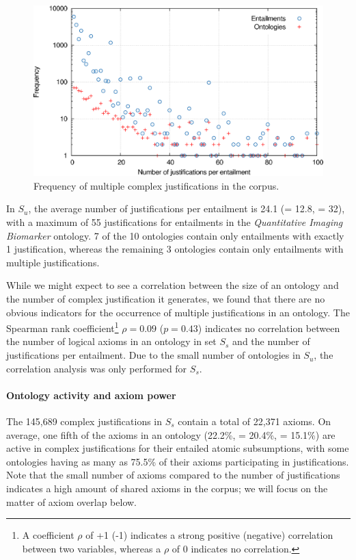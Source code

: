 \begin{figure}
\centering
\includegraphics[width=14cm]{plots/frequency.pdf}
\caption{Frequency of multiple complex justifications in the corpus.}
\label{fig:frequency-justperent-nonself-sat}
\end{figure}

In $S_{u}$, the average number of justifications per entailment is 24.1 (\sdev = 12.8, \median = 32), with a maximum of 55 justifications for entailments in the \emph{Quantitative Imaging Biomarker} ontology. 7 of the 10 ontologies contain only entailments with exactly 1 justification, whereas the remaining 3 ontologies contain only entailments with multiple justifications. 

While we might expect to see a correlation between the size of an ontology and the number of complex justification it generates, we found that there are no obvious indicators for the occurrence of multiple justifications in an ontology. The Spearman rank coefficient\footnote{A coefficient $\rho$ of +1 (-1) indicates a strong positive (negative) correlation between two variables, whereas a $\rho$ of 0 indicates no correlation.} $\rho = 0.09$ ($p = 0.43$) indicates no correlation between the number of logical axioms in an ontology in set $S_{s}$ and the number of justifications per entailment. Due to the small number of ontologies in $S_{u}$, the correlation analysis was only performed for $S_{s}$.

\paragraph{Ontology activity and axiom power}

The 145,689 complex justifications in $S_{s}$ contain a total of 22,371 axioms. On average, one fifth of the axioms in an ontology (22.2\%, \sdev = 20.4\%, \median = 15.1\%) are active in  complex justifications for their entailed atomic subsumptions, with some ontologies having as many as 75.5\% of their axioms participating in justifications. Note that the small number of axioms compared to the number of justifications indicates a high amount of shared axioms in the corpus; we will focus on the matter of axiom overlap below.

